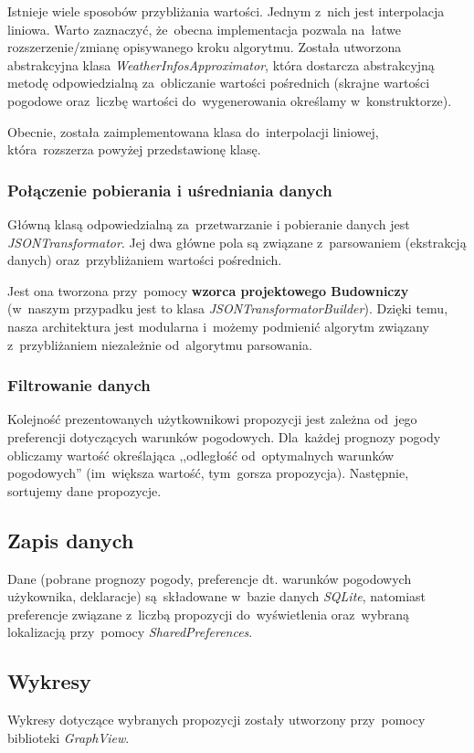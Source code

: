 \documentclass[11pt, a4paper, oneside]{scrartcl}
\begin{document}
Istnieje wiele sposobów przybliżania wartości. Jednym z~nich jest interpolacja liniowa. Warto zaznaczyć, że~obecna implementacja
pozwala na~łatwe rozszerzenie/zmianę opisywanego kroku algorytmu. Została utworzona abstrakcyjna klasa \textit{WeatherInfosApproximator},
która dostarcza abstrakcyjną metodę odpowiedzialną za~obliczanie wartości pośrednich (skrajne wartości pogodowe oraz~liczbę wartości do~wygenerowania
określamy w~konstruktorze).

Obecnie, została zaimplementowana klasa do~interpolacji liniowej, która~rozszerza powyżej przedstawionę klasę.

\subsubsection{Połączenie pobierania i uśredniania danych}
Główną klasą odpowiedzialną za~przetwarzanie i pobieranie danych jest \textit{JSONTransformator}. Jej dwa główne pola są związane z~parsowaniem
(ekstrakcją danych) oraz~przybliżaniem wartości pośrednich.

Jest ona tworzona przy~pomocy \textbf{wzorca projektowego Budowniczy} (w~naszym
przypadku jest to klasa \textit{JSONTransformatorBuilder}). Dzięki temu, nasza architektura jest modularna i~możemy podmienić algorytm
związany z~przybliżaniem niezależnie od~algorytmu parsowania.

\subsubsection{Filtrowanie danych}
Kolejność prezentowanych użytkownikowi propozycji jest zależna od~jego preferencji dotyczących warunków pogodowych. Dla~każdej prognozy pogody
obliczamy wartość określająca ,,odległość od~optymalnych warunków pogodowych'' (im~większa wartość, tym~gorsza propozycja).
Następnie, sortujemy dane propozycje. 

\subsection{Zapis danych}
Dane (pobrane prognozy pogody, preferencje dt. warunków pogodowych użykownika, deklaracje) są~składowane w~bazie danych \textit{SQLite},
natomiast preferencje związane z~liczbą propozycji do~wyświetlenia oraz~wybraną lokalizacją przy~pomocy \textit{SharedPreferences}.

\subsection{Wykresy}
Wykresy dotyczące wybranych propozycji zostały utworzony przy~pomocy biblioteki \textit{GraphView}.
\end{document}
